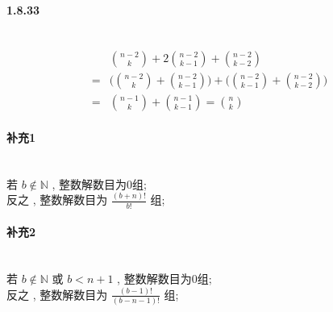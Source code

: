 \documentclass[a4paper, UTF8]{ctexart}				%
\numberwithin{equation}{section}				%
\begin{document}
    \paragraph{1.8.33}\quad\\
        \begin{equation*}
            \begin{split}
                & \binom{n - 2}{k} + 2\binom{n - 2}{k - 1} + \binom{n - 2}{k - 2}\\
                = & \Biggl(\binom{n-2}{k} + \binom{n - 2}{k - 1} \Biggl) + \Biggl(\binom{n - 2}{k - 1} + \binom{n - 2}{k - 2}\Biggl)\\
                = & \binom{n - 1}{k} + \binom{n - 1}{k - 1} = \binom{n}{k}
            \end{split}
        \end{equation*}
    \paragraph{补充1}\quad\\
        若 $b \notin \mathbb{N}$ , 整数解数目为$0$组;\\
        反之 , 整数解数目为 $\frac{(b + n)!}{b!}$ 组;
    \paragraph{补充2}\quad\\
        若 $b \notin \mathbb{N}$ 或 $b < n + 1$ , 整数解数目为$0$组;\\
        反之 , 整数解数目为 $\frac{(b - 1)!}{(b - n - 1)!}$ 组;
\end{document}
